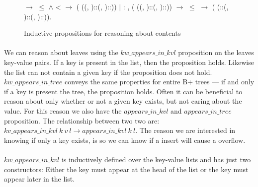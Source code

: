 \begin{figure}
\begin{coqdoccode}
  \coqdocindent{8.00em}
      \ensuremath{\rightarrow}  \ensuremath{\le}  \ensuremath{\land}  <  \ensuremath{\rightarrow}\coqdoceol
  \coqdocindent{8.00em}
     (   ((, )::(, )::))\coqdoceol
  \coqdocindent{1.00em}
  \ensuremath{|} : \coqdockw{\ensuremath{\forall}}      ,\coqdoceol
  \coqdocindent{8.00em}
     (   ((, )::(, )::)) \ensuremath{\rightarrow} \coqdoceol
  \coqdocindent{8.00em}
   \ensuremath{\le}  \ensuremath{\rightarrow}\coqdoceol
  \coqdocindent{8.00em}
     (   (::(, )::(, )::)).\coqdoceol
  \end{coqdoccode}
\caption{Inductive propositions for reasoning about contents}
\label{fig:aik_and_ait}
\end{figure}

\paragraph{}
We can reason about leaves using the $kw\_appears\_in\_kvl$ proposition on the leaves key-value pairs. If a key is present in the list, then the proposition holds. Likewise the list can not contain a given key if the proposition does not hold. $kw\_appears\_in\_tree$ conveys the same properties for entire B+ trees --- if and only if a key is present the tree, the proposition holds. Often it can be beneficial to reason about only whether or not a given key exists, but not caring about the value. For this reason we also have the $appears\_in\_kvl$ and $appears\_in\_tree$ proposition. The relationship between two two are: $kv\_appears\_in\_kvl~k~v~l \rightarrow appears\_in\_kvl~k~l$. The reason we are interested in knowing if only a key exists, is so we can know if a insert will cause a overflow.

\paragraph{}
$kw\_appears\_in\_kvl$ is inductively defined over the key-value lists and has just two constructors: Either the key must appear at the head of the list or the key must appear later in the list.

